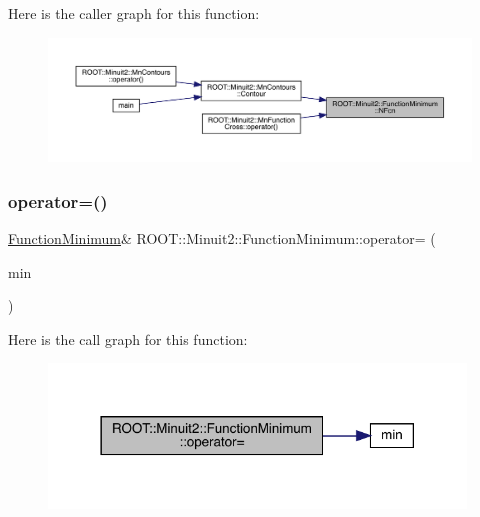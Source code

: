 Here is the caller graph for this function\+:
\nopagebreak
\begin{figure}[H]
\begin{center}
\leavevmode
\includegraphics[width=350pt]{d4/dfb/classROOT_1_1Minuit2_1_1FunctionMinimum_a8af0f1813c9ae51d7a57a1de0cbae42f_icgraph}
\end{center}
\end{figure}
\mbox{\label{classROOT_1_1Minuit2_1_1FunctionMinimum_a107909f1a994436795eb310f951f14cb}} 
\subsubsection{\texorpdfstring{operator=()}{operator=()}\hspace{0.1cm}{\footnotesize\ttfamily [1/3]}}
{\footnotesize\ttfamily \mbox{\hyperlink{classROOT_1_1Minuit2_1_1FunctionMinimum}{Function\+Minimum}}\& R\+O\+O\+T\+::\+Minuit2\+::\+Function\+Minimum\+::operator= (\begin{DoxyParamCaption}\item[{const \mbox{\hyperlink{classROOT_1_1Minuit2_1_1FunctionMinimum}{Function\+Minimum}} \&}]{min }\end{DoxyParamCaption})\hspace{0.3cm}{\ttfamily [inline]}}

Here is the call graph for this function\+:
\nopagebreak
\begin{figure}[H]
\begin{center}
\leavevmode
\includegraphics[width=314pt]{d4/dfb/classROOT_1_1Minuit2_1_1FunctionMinimum_a107909f1a994436795eb310f951f14cb_cgraph}
\end{center}
\end{figure}
\mbox{\label{classROOT_1_1Minuit2_1_1FunctionMinimum_a107909f1a994436795eb310f951f14cb}} 

